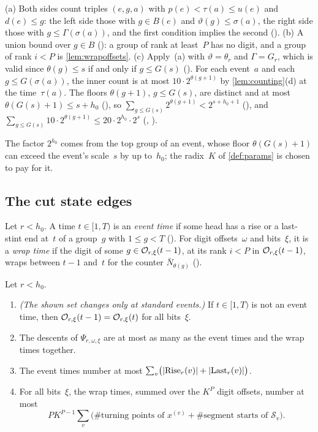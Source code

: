 \begin{outline}
(a) Both sides count triples $(e,g,a)$ with $p(e)<\tau(a)\le u(e)$ and $d(e)\le g$: the left side those with $g\in B(e)$ and
$\vartheta(g)\le\sigma(a)$, the right side those with $g\le\Gamma(\sigma(a))$, and the first condition implies the second
(). (b) A union bound over $g\in B$ (): a group of rank at least~$P$ has no digit,
and a group of rank $i<P$ is \cref{lem:wrapoffsets}. (c) Apply~(a) with $\vartheta=\theta_r$ and $\Gamma=G_r$, which is valid since
$\theta(g)\le s$ if and only if $g\le G(s)$ (). For each event~$a$ and each $g\le G(\sigma(a))$, the inner count is
at most $10\cdot2^{\theta(g+1)}$ by \cref{lem:counting}(d) at the time~$\tau(a)$. The floors $\theta(g+1)$, $g\le G(s)$, are
distinct and at most $\theta(G(s)+1)\le s+h_0$ (), so $\sum_{g\le G(s)}2^{\theta(g+1)}<2^{s+h_0+1}$
(), and $\sum_{g\le G(s)}10\cdot2^{\theta(g+1)}\le20\cdot2^{h_0}\cdot2^s$
(, ).
\end{outline}

The factor $2^{h_0}$ comes from the top group of an event, whose floor $\theta(G(s)+1)$ can exceed the event's scale~$s$ by
up to~$h_0$; the radix~$K$ of \cref{def:params} is chosen to pay for it.

\subsection{The cut state edges}\label{sec:acc-descents}

Let $r<h_0$. A time $t\in[1,T)$ is an \emph{event time} if some head has a rise or a last-stint end at~$t$ of a group~$g$ with
$1\le g<T$ (). For digit offsets~$\omega$ and bits~$\xi$, it is a \emph{wrap time} if the digit of some
$g\in\mathcal{O}_{r,\xi}(t-1)$, at its rank $i<P$ in $\mathcal{O}_{r,\xi}(t-1)$, wraps between $t-1$ and~$t$ for the counter $\bar N_{\theta(g)}$
().

\begin{lemma}\label{lem:descents}
Let $r<h_0$.
\begin{enumerate}[label=(\alph*)]
\item \emph{(The shown set changes only at standard events.)} If $t\in[1,T)$ is not an event time, then
$\mathcal{O}_{r,\xi}(t-1)=\mathcal{O}_{r,\xi}(t)$ for all bits~$\xi$.
\item The descents of $\Psi_{r,\omega,\xi}$ are at most as many as the event times and the wrap times together.
\item The event times number at most $\sum_v\bigl(\lvert \mathrm{Rise}_r(v) \rvert+\lvert \mathrm{Last}_r(v) \rvert\bigr)$.
\item For all bits~$\xi$, the wrap times, summed over the $K^P$ digit offsets, number at most
\[
  PK^{P-1}\sum_v\bigl(\#\text{turning points of }x^{(v)}+\#\text{segment starts of }\mathcal S_v\bigr).
\]
\end{enumerate}
\end{lemma}

